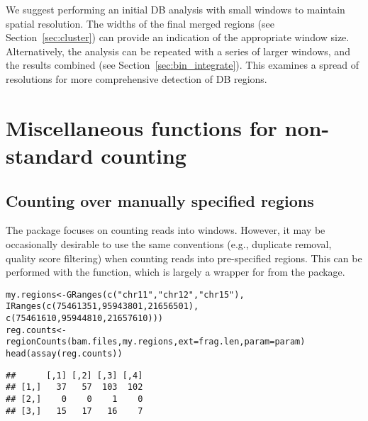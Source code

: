 \documentclass{report}\usepackage[]{graphicx}\usepackage[usenames,dvipsnames]{color}
\newcommand{\hlnum}[1]{\textcolor[rgb]{0.816,0.125,0.439}{#1}}%
\newcommand{\hlstr}[1]{\textcolor[rgb]{0.251,0.627,0.251}{#1}}%
\newcommand{\hlstd}[1]{\textcolor[rgb]{0.251,0.251,0.251}{#1}}%
\newcommand{\hlkwb}[1]{\textcolor[rgb]{0,0,0}{#1}}%
\newcommand{\hlkwc}[1]{\textcolor[rgb]{0.251,0.251,0.251}{#1}}%
\newcommand{\hlkwd}[1]{\textcolor[rgb]{0.878,0.439,0.125}{#1}}%
\newenvironment{knitrout}{}{} %
\begin{document}
We suggest performing an initial DB analysis with small windows to maintain spatial resolution.
The widths of the final merged regions (see Section~\ref{sec:cluster}) can provide an indication of the appropriate window size.
Alternatively, the analysis can be repeated with a series of larger windows, and the results combined (see Section~\ref{sec:bin_integrate}).
This examines a spread of resolutions for more comprehensive detection of DB regions.

\section{Miscellaneous functions for non-standard counting}

\subsection{Counting over manually specified regions}
The  package focuses on counting reads into windows. 
However, it may be occasionally desirable to use the same conventions (e.g., duplicate removal, quality score filtering) when counting reads into pre-specified regions. 
This can be performed with the  function, which is largely a wrapper for  from the  package.

\begin{knitrout}
\color{fgcolor}\begin{kframe}
\begin{alltt}
\hlstd{my.regions} \hlkwb{<-} \hlkwd{GRanges}\hlstd{(}\hlkwd{c}\hlstd{(}\hlstr{"chr11"}\hlstd{,} \hlstr{"chr12"}\hlstd{,} \hlstr{"chr15"}\hlstd{),}
                      \hlkwd{IRanges}\hlstd{(}\hlkwd{c}\hlstd{(}\hlnum{75461351}\hlstd{,} \hlnum{95943801}\hlstd{,} \hlnum{21656501}\hlstd{),}
                      \hlkwd{c}\hlstd{(}\hlnum{75461610}\hlstd{,} \hlnum{95944810}\hlstd{,} \hlnum{21657610}\hlstd{)))}
\hlstd{reg.counts} \hlkwb{<-} \hlkwd{regionCounts}\hlstd{(bam.files, my.regions,} \hlkwc{ext}\hlstd{=frag.len,} \hlkwc{param}\hlstd{=param)}
\hlkwd{head}\hlstd{(}\hlkwd{assay}\hlstd{(reg.counts))}
\end{alltt}
\begin{verbatim}
##      [,1] [,2] [,3] [,4]
## [1,]   37   57  103  102
## [2,]    0    0    1    0
## [3,]   15   17   16    7
\end{verbatim}
\end{kframe}
\end{knitrout}
\end{document}

